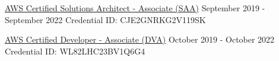 \documentclass[letterpaper]{awesome-cv}
\begin{document}
\begin{cventries}
  \cventry
    {
      \href{https://www.certmetrics.com/amazon/public/badge.aspx?i=1\&t=c\&d=2019-09-12\&ci=AWS00457357}{AWS Certified Solutions Architect - Associate (SAA)}
    }
    {September 2019 - September 2022}
    {Credential ID: CJE2GNRKG2V119SK}
    {}
    {}

  \cventry
    {
      \href{https://www.certmetrics.com/amazon/public/badge.aspx?i=2\&t=c\&d=2019-10-09\&ci=AWS00457357}{AWS Certified Developer - Associate (DVA)}
    }
    {October 2019 - October 2022}
    {Credential ID: WL82LHC23BV1Q6G4}
    {}
    {}

\end{cventries}
\end{document}
